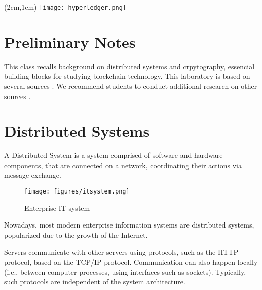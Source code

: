 \documentclass[12pt,a4paper]{article}
\begin{document}
\textblockorigin{-34pt}{-12pt}
\begin{textblock*}{10cm}(2cm,1cm)
\texttt{[image: hyperledger.png]}
\end{textblock*}

\section*{Preliminary Notes}
This class recalls background on distributed systems and crpytography, essencial building blocks for studying blockchain technology. This laboratory is based on several sources \cite{dscd,sdist2017,Wong2014,Ousterhout_presentation,Verissimo2001,correia2019byzantine,raft_paper}. We recommend students to conduct additional research on other sources \cite{mit,princeton}.





\section{Distributed Systems}
\label{sec:ds}
A Distributed System is a system comprised of software and hardware components, that are connected on a network, coordinating their actions via message exchange. 

\begin{figure}[h!]
    \centering
    \texttt{[image: figures/itsystem.png]}
    \caption{Enterprise IT system \cite{Wong2014}}
    \label{fig:internet}
\end{figure}

Nowadays, most modern enterprise information systems are distributed systems, popularized due to the growth of the Internet.


Servers communicate with other servers using protocols, such as the HTTP protocol, based on the TCP/IP protocol. Communication can also happen locally (i.e., between computer processes, using interfaces such as sockets). Typically, such protocols are independent of the system architecture.
\end{document}
